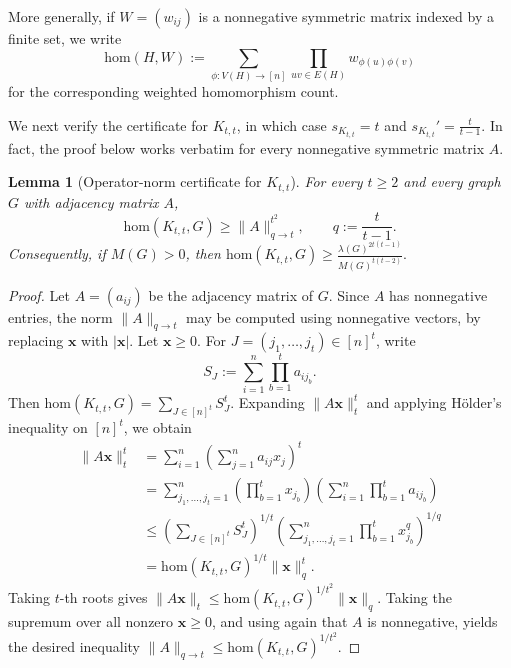 \documentclass[10pt,a4paper]{amsart}
\newtheorem{lemma}[theorem]{Lemma}
\newcommand{\homc}{\mathrm{hom}}
\begin{document}
More generally, if \(W=(w_{ij})\) is a nonnegative symmetric matrix indexed by a finite set, we write
\[
        \homc(H,W)
        :=
        \sum_{\phi:V(H)\to [n]}
        \prod_{uv\in E(H)} w_{\phi(u)\phi(v)}
\]
for the corresponding weighted homomorphism count.

We next verify the certificate for \(K_{t,t}\), in which case 
        $s_{K_{t,t}}=t$ and $
        s_{K_{t,t}}'=\frac{t}{t-1}.$
In fact, the proof below works verbatim for every nonnegative
symmetric matrix \(A\).

\begin{lemma}[Operator-norm certificate for \(K_{t,t}\)]
\label{lem:operator-certificate-Ktt}
For every \(t\ge2\) and every graph \(G\) with adjacency matrix \(A\),
\[
        \homc(K_{t,t},G)\ge \|A\|_{q\to t}^{t^2},
        \qquad
        q:=\frac{t}{t-1}.
\]
Consequently, if \(M(G)>0\), then
$\homc(K_{t,t},G)
        \ge
        \frac{\lambda(G)^{2t(t-1)}}{M(G)^{t(t-2)}}.
$
\end{lemma}

\begin{proof}
Let \(A=(a_{ij})\) be the adjacency matrix of \(G\).  Since \(A\) has
nonnegative entries, the norm \(\|A\|_{q\to t}\) may be computed using
nonnegative vectors, by replacing \(\bm{x}\) with \(|\bm{x}|\).
Let \(\bm{x}\ge0\).  For
\(J=(j_1,\ldots,j_t)\in[n]^t\), write
\[
        S_J
        :=
        \sum_{i=1}^n\prod_{b=1}^t a_{ij_b}.
\]
Then
$        \homc(K_{t,t},G)
        =
        \sum_{J\in[n]^t}S_J^t.$
Expanding \(\|A\bm{x}\|_t^t\) and applying H\"older's inequality on
\([n]^t\), we obtain
\[
\begin{aligned}
        \|A\bm{x}\|_t^t
        &=
        \sum_{i=1}^n
        \left(\sum_{j=1}^n a_{ij}x_j\right)^t                         \\
        &=
        \sum_{j_1,\ldots,j_t=1}^n
        \left(\prod_{b=1}^t x_{j_b}\right)
        \left(\sum_{i=1}^n\prod_{b=1}^t a_{ij_b}\right)                \\
        &\le
        \left(\sum_{J\in[n]^t}S_J^t\right)^{1/t}
        \left(
        \sum_{j_1,\ldots,j_t=1}^n
        \prod_{b=1}^t x_{j_b}^q
        \right)^{1/q}                                                  \\
        &=
        \homc(K_{t,t},G)^{1/t}\|\bm{x}\|_q^t .
\end{aligned}
\]
Taking \(t\)-th roots gives
$ \|A\bm{x}\|_t
        \le
        \homc(K_{t,t},G)^{1/t^2}\|\bm{x}\|_q .
$
Taking the supremum over all nonzero \(\bm{x}\ge0\), and using again
that \(A\) is nonnegative, yields the desired inequality
$        \|A\|_{q\to t}
        \le
        \homc(K_{t,t},G)^{1/t^2}.
$
\end{proof}
\end{document}
